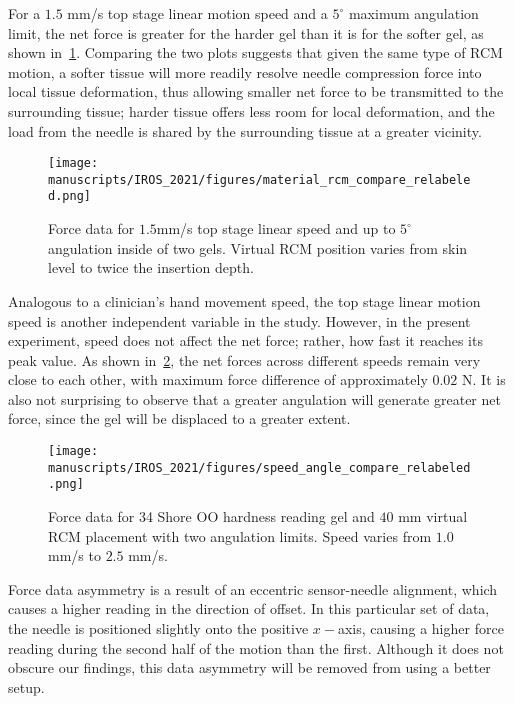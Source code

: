 For a $1.5$ mm/s top stage linear motion speed and a $5^\circ$ maximum angulation limit, the net force is greater for the harder gel than it is for the softer gel, as shown in~\cref{fig:material_rcm_compare}. Comparing the two plots suggests that given the same type of RCM motion, a softer tissue will more readily resolve needle compression force into local tissue deformation, thus allowing smaller net force to be transmitted to the surrounding tissue; harder tissue offers less room for local deformation, and the load from the needle is shared by the surrounding tissue at a greater vicinity.

\begin{figure}[tb]
  \centering
  \texttt{[image: manuscripts/IROS\_2021/figures/material\_rcm\_compare\_relabeled.png]}
  \caption{Force data for $1.5$mm/s top stage linear speed and up to $5^\circ$ angulation inside of two gels. Virtual RCM position varies from skin level to twice the insertion depth.}
  \label{fig:material_rcm_compare}
\end{figure}

Analogous to a clinician's hand movement speed, the top stage linear motion speed is another independent variable in the study. However, in the present experiment, speed does not affect the net force; rather, how fast it reaches its peak value. As shown in~\cref{fig:speed_angle_compare}, the net forces across different speeds remain very close to each other, with maximum force difference of approximately $0.02$ N. It is also not surprising to observe that a greater angulation will generate greater net force, since the gel will be displaced to a greater extent.

\begin{figure}[tb]
  \centering
  \texttt{[image: manuscripts/IROS\_2021/figures/speed\_angle\_compare\_relabeled.png]}
  \caption{Force data for 34 Shore OO hardness reading gel and $40$ mm virtual RCM placement with two angulation limits. Speed varies from $1.0$ mm/s to $2.5$ mm/s.}
  \label{fig:speed_angle_compare}
\end{figure}

Force data asymmetry is a result of an eccentric sensor-needle alignment, which causes a higher reading in the direction of offset. In this particular set of data, the needle is positioned slightly onto the positive $x-$axis, causing a higher force reading during the second half of the motion than the first. Although it does not obscure our findings, this data asymmetry will be removed from using a better setup.


